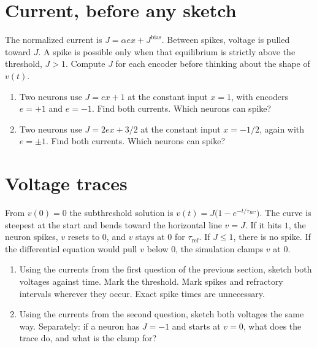 \documentclass[11pt,letterpaper]{article}
\newcommand{\Jb}{J^{\mathrm{bias}}}
\newcommand{\tref}{\tau_{\mathrm{ref}}}
\newcommand{\trc}{\tau_{RC}}
\begin{document}
\section{Current, before any sketch}

\begin{idea}
The normalized current is $J = \alpha e x + \Jb$. Between spikes, voltage is pulled toward $J$. A spike is possible only when that equilibrium is strictly above the threshold, $J > 1$. Compute $J$ for each encoder before thinking about the shape of $v(t)$.
\end{idea}

\begin{enumerate}
\item Two neurons use $J = ex + 1$ at the constant input $x = 1$, with encoders $e = +1$ and $e = -1$. Find both currents. Which neurons can spike?
\item Two neurons use $J = 2ex + 3/2$ at the constant input $x = -1/2$, again with $e = \pm 1$. Find both currents. Which neurons can spike?
\end{enumerate}

\section{Voltage traces}

\begin{idea}
From $v(0) = 0$ the subthreshold solution is $v(t) = J\bigl(1 - e^{-t/\trc}\bigr)$. The curve is steepest at the start and bends toward the horizontal line $v = J$. If it hits $1$, the neuron spikes, $v$ resets to $0$, and $v$ stays at $0$ for $\tref$. If $J \le 1$, there is no spike. If the differential equation would pull $v$ below $0$, the simulation clamps $v$ at $0$.
\end{idea}

\begin{enumerate}
\item Using the currents from the first question of the previous section, sketch both voltages against time. Mark the threshold. Mark spikes and refractory intervals wherever they occur. Exact spike times are unnecessary.
\item Using the currents from the second question, sketch both voltages the same way. Separately: if a neuron has $J = -1$ and starts at $v = 0$, what does the trace do, and what is the clamp for?
\end{enumerate}
\end{document}
